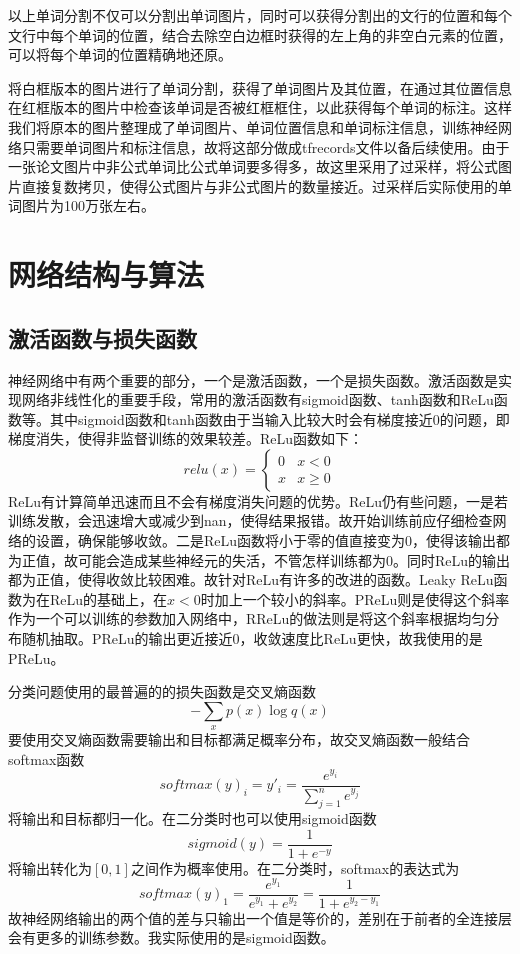 \documentclass[12pt]{article}
\begin{document}
以上单词分割不仅可以分割出单词图片，同时可以获得分割出的文行的位置和每个文行中每个单词的位置，结合去除空白边框时获得的左上角的非空白元素的位置，可以将每个单词的位置精确地还原。

将白框版本的图片进行了单词分割，获得了单词图片及其位置，在通过其位置信息在红框版本的图片中检查该单词是否被红框框住，以此获得每个单词的标注。这样我们将原本的图片整理成了单词图片、单词位置信息和单词标注信息，训练神经网络只需要单词图片和标注信息，故将这部分做成tfrecords文件以备后续使用。由于一张论文图片中非公式单词比公式单词要多得多，故这里采用了过采样，将公式图片直接复数拷贝，使得公式图片与非公式图片的数量接近。过采样后实际使用的单词图片为100万张左右。

\section{网络结构与算法}

\subsection{激活函数与损失函数}
\noindent

神经网络中有两个重要的部分，一个是激活函数，一个是损失函数。激活函数是实现网络非线性化的重要手段，常用的激活函数有sigmoid函数、tanh函数和ReLu函数等。其中sigmoid函数和tanh函数由于当输入比较大时会有梯度接近0的问题，即梯度消失，使得非监督训练的效果较差。ReLu函数如下：
$$relu(x) = 
\begin{cases} 
0& x < 0\\
x& x \ge 0
\end{cases}$$
ReLu有计算简单迅速而且不会有梯度消失问题的优势。ReLu仍有些问题，一是若训练发散，会迅速增大或减少到nan，使得结果报错。故开始训练前应仔细检查网络的设置，确保能够收敛。二是ReLu函数将小于零的值直接变为0，使得该输出都为正值，故可能会造成某些神经元的失活，不管怎样训练都为0。同时ReLu的输出都为正值，使得收敛比较困难。故针对ReLu有许多的改进的函数。Leaky ReLu函数为在ReLu的基础上，在$x<0$时加上一个较小的斜率。PReLu则是使得这个斜率作为一个可以训练的参数加入网络中，RReLu的做法则是将这个斜率根据均匀分布随机抽取。PReLu的输出更近接近0，收敛速度比ReLu更快，故我使用的是PReLu。

分类问题使用的最普遍的的损失函数是交叉熵函数$$- \sum_x p(x) \log q(x)$$ 要使用交叉熵函数需要输出和目标都满足概率分布，故交叉熵函数一般结合softmax函数$$softmax(y)_i = y'_i = \frac{e^{y_i}}{\sum^n_{j=1} e^{y_j}}$$将输出和目标都归一化。在二分类时也可以使用sigmoid函数$$sigmoid(y) = \frac 1 {1 + e^{-y}}$$将输出转化为$[0, 1]$之间作为概率使用。在二分类时，softmax的表达式为$$softmax(y)_1 = \frac{e^{y_1}}{e^{y_1} + e^{y_2}} = \frac 1 {1 + e^{y_2 - y_1}}$$ 故神经网络输出的两个值的差与只输出一个值是等价的，差别在于前者的全连接层会有更多的训练参数。我实际使用的是sigmoid函数。
\end{document}
